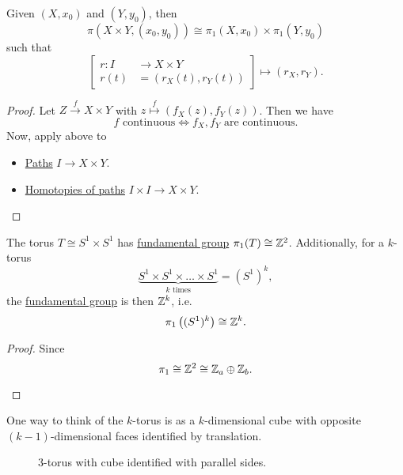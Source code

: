 \begin{theorem}
	Given \((X, x_0)\) and \((Y, y_0)\), then
	\[
		\pi (X\times Y, (x_0, y_0)) \cong \pi_1(X, x_0)\times \pi _1(Y, y_0)
	\]
	such that
	\[
		\left[\begin{alignedat}{3}
				r\colon I&\to X\times Y\\
				r(t) &= \left(r_X(t), r_Y(t)\right)
			\end{alignedat}\right] \mapsto (r_{X}, r_{Y}).
	\]
\end{theorem}
\begin{proof}
	Let \(Z\overset{f}{\to} X\times Y\) with \(z\overset{f}{\mapsto} \left(f_{X}(z), f_{Y}(z)\right)\). Then we have
	\[
		f\text{ continuous}\iff f_{X}, f_{Y}  \text{ are continuous}.
	\]
	Now, apply above to
	\begin{itemize}
		\item \hyperref[def:path]{Paths} \(I\to X\times Y\).
		\item \hyperref[def:homotopy-path]{Homotopies of paths} \(I\times I\to X\times Y\).
	\end{itemize}
\end{proof}

\begin{corollary}
	The torus \(T\cong S^{1}\times S^1\) has \hyperref[def:fundamental-group]{fundamental group} \(\pi _1(T)\cong \mathbb{\MakeUppercase{z}} ^2\). Additionally,
	for a \(k\)-torus
	\[
		\underbrace{S^{1}\times S^1 \times \ldots \times S^1}_{k\text{ times}} = (S^1)^k,
	\]
	the \hyperref[def:fundamental-group]{fundamental group}
	is then \(\mathbb{\MakeUppercase{z}} ^k\), i.e.
	\[
		\pi _1\left((S^1)^k\right) \cong \mathbb{\MakeUppercase{z}} ^k.
	\]
\end{corollary}
\begin{proof}
	Since
	\[
		\pi _1 \cong \mathbb{\MakeUppercase{z}}^2 \cong \mathbb{\MakeUppercase{z}} _a \oplus \mathbb{\MakeUppercase{z}} _b.
	\]
	\begin{figure}[H]
		\centering
		\label{fig:pf:torus-fundamental-group}
	\end{figure}
\end{proof}
\begin{remark}
	One way to think of the \(k\)-torus is as a \(k\)-dimensional cube with opposite \((k-1)\)-dimensional faces identified by translation.
	\begin{figure}[H]
		\centering
		\caption{\(3\)-torus with cube identified with parallel sides.}
		\label{fig:3-torus}
	\end{figure}
\end{remark}

